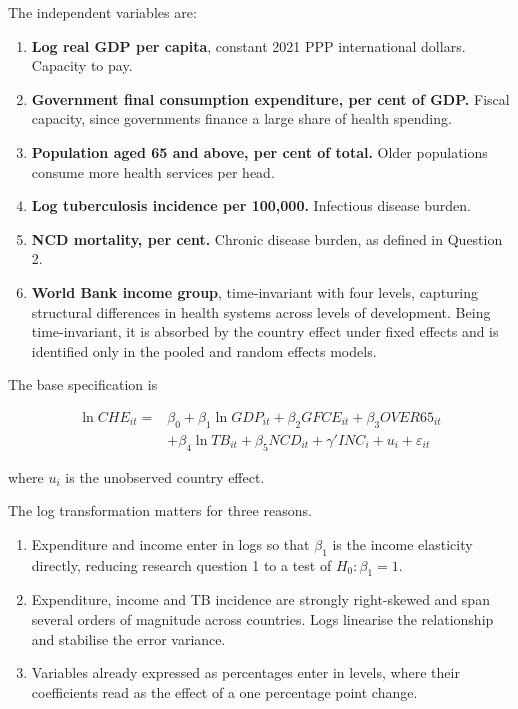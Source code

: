 \documentclass[11pt,a4paper]{article}
\begin{document}
The independent variables are:

\begin{enumerate}
  \item \textbf{Log real GDP per capita}, constant 2021 PPP international
        dollars. Capacity to pay.

  \item \textbf{Government final consumption expenditure, per cent of GDP.}
        Fiscal capacity, since governments finance a large share of health
        spending.

  \item \textbf{Population aged 65 and above, per cent of total.} Older
        populations consume more health services per head.

  \item \textbf{Log tuberculosis incidence per 100,000.} Infectious disease
        burden.

  \item \textbf{NCD mortality, per cent.} Chronic disease burden, as defined in
        Question 2.

  \item \textbf{World Bank income group}, time-invariant with four levels,
        capturing structural differences in health systems across levels of
        development. Being time-invariant, it is absorbed by the country effect
        under fixed effects and is identified only in the pooled and random
        effects models.
\end{enumerate}

The base specification is

\begin{equation*}
\begin{split}
\ln \mathit{CHE}_{it} = {} & \beta_0 + \beta_1 \ln \mathit{GDP}_{it}
  + \beta_2 \mathit{GFCE}_{it} + \beta_3 \mathit{OVER65}_{it} \\
  & + \beta_4 \ln \mathit{TB}_{it} + \beta_5 \mathit{NCD}_{it}
  + \gamma' \mathit{INC}_i + u_i + \varepsilon_{it}
\end{split}
\end{equation*}

where $u_i$ is the unobserved country effect.

The log transformation matters for three reasons.

\begin{enumerate}
  \item Expenditure and income enter in logs so that $\beta_1$ is the income
        elasticity directly, reducing research question 1 to a test of
        $H_0 : \beta_1 = 1$.

  \item Expenditure, income and TB incidence are strongly right-skewed and span
        several orders of magnitude across countries. Logs linearise the
        relationship and stabilise the error variance.

  \item Variables already expressed as percentages enter in levels, where their
        coefficients read as the effect of a one percentage point change.
\end{enumerate}
\end{document}
